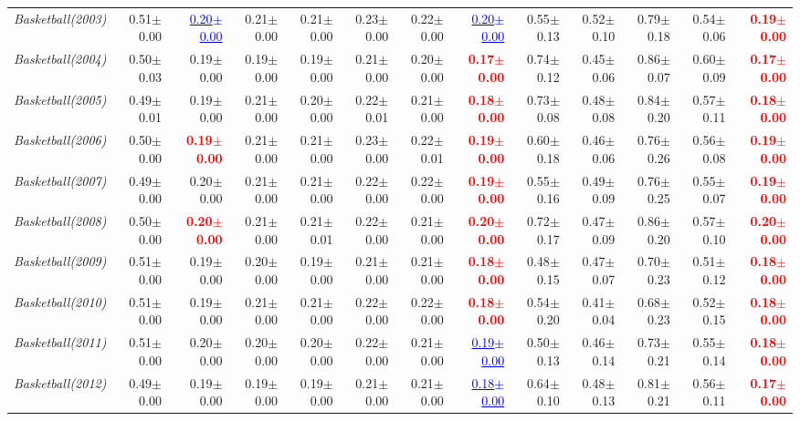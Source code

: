 \documentclass[nohyperref]{article}
\theoremstyle{plain}
\theoremstyle{definition}
\theoremstyle{remark}
\newcommand{\red}[1]{\textcolor{red}{\textbf{#1}}}
\newcommand{\blue}[1]{\textcolor{blue}{\underline{#1}}}
\begin{document}
\begin{table*}[!ht]
{\begin{tabular}{lrr|rrrrr|rrrrr}
			{\it Basketball(2003)} & 0.51$\pm$0.00 & \blue{0.20$\pm$0.00} & 0.21$\pm$0.00 & 0.21$\pm$0.00 & 0.23$\pm$0.00 & 0.22$\pm$0.00 & \blue{0.20$\pm$0.00} & 0.55$\pm$0.13 & 0.52$\pm$0.10 & 0.79$\pm$0.18 & 0.54$\pm$0.06 & \red{0.19$\pm$0.00} \\
			{\it Basketball(2004)} & 0.50$\pm$0.03 & 0.19$\pm$0.00 & 0.19$\pm$0.00 & 0.19$\pm$0.00 & 0.21$\pm$0.00 & 0.20$\pm$0.00 & \red{0.17$\pm$0.00} & 0.74$\pm$0.12 & 0.45$\pm$0.06 & 0.86$\pm$0.07 & 0.60$\pm$0.09 & \red{0.17$\pm$0.00} \\
			{\it Basketball(2005)} & 0.49$\pm$0.01 & 0.19$\pm$0.00 & 0.21$\pm$0.00 & 0.20$\pm$0.00 & 0.22$\pm$0.01 & 0.21$\pm$0.00 & \red{0.18$\pm$0.00} & 0.73$\pm$0.08 & 0.48$\pm$0.08 & 0.84$\pm$0.20 & 0.57$\pm$0.11 & \red{0.18$\pm$0.00} \\
			{\it Basketball(2006)} & 0.50$\pm$0.00 & \red{0.19$\pm$0.00} & 0.21$\pm$0.00 & 0.21$\pm$0.00 & 0.23$\pm$0.00 & 0.22$\pm$0.01 & \red{0.19$\pm$0.00} & 0.60$\pm$0.18 & 0.46$\pm$0.06 & 0.76$\pm$0.26 & 0.56$\pm$0.08 & \red{0.19$\pm$0.00} \\
			{\it Basketball(2007)} & 0.49$\pm$0.00 & 0.20$\pm$0.00 & 0.21$\pm$0.00 & 0.21$\pm$0.00 & 0.22$\pm$0.00 & 0.22$\pm$0.00 & \red{0.19$\pm$0.00} & 0.55$\pm$0.16 & 0.49$\pm$0.09 & 0.76$\pm$0.25 & 0.55$\pm$0.07 & \red{0.19$\pm$0.00} \\
			{\it Basketball(2008)} & 0.50$\pm$0.00 & \red{0.20$\pm$0.00} & 0.21$\pm$0.00 & 0.21$\pm$0.01 & 0.22$\pm$0.00 & 0.21$\pm$0.00 & \red{0.20$\pm$0.00} & 0.72$\pm$0.17 & 0.47$\pm$0.09 & 0.86$\pm$0.20 & 0.57$\pm$0.10 & \red{0.20$\pm$0.00} \\
			{\it Basketball(2009)} & 0.51$\pm$0.00 & 0.19$\pm$0.00 & 0.20$\pm$0.00 & 0.19$\pm$0.00 & 0.21$\pm$0.00 & 0.21$\pm$0.00 & \red{0.18$\pm$0.00} & 0.48$\pm$0.15 & 0.47$\pm$0.07 & 0.70$\pm$0.23 & 0.51$\pm$0.12 & \red{0.18$\pm$0.00} \\
			{\it Basketball(2010)} & 0.51$\pm$0.00 & 0.19$\pm$0.00 & 0.21$\pm$0.00 & 0.21$\pm$0.00 & 0.22$\pm$0.00 & 0.22$\pm$0.00 & \red{0.18$\pm$0.00} & 0.54$\pm$0.20 & 0.41$\pm$0.04 & 0.68$\pm$0.23 & 0.52$\pm$0.15 & \red{0.18$\pm$0.00} \\
			{\it Basketball(2011)} & 0.51$\pm$0.00 & 0.20$\pm$0.00 & 0.20$\pm$0.00 & 0.20$\pm$0.00 & 0.22$\pm$0.00 & 0.21$\pm$0.00 & \blue{0.19$\pm$0.00} & 0.50$\pm$0.13 & 0.46$\pm$0.14 & 0.73$\pm$0.21 & 0.55$\pm$0.14 & \red{0.18$\pm$0.00} \\
			{\it Basketball(2012)} & 0.49$\pm$0.00 & 0.19$\pm$0.00 & 0.19$\pm$0.00 & 0.19$\pm$0.00 & 0.21$\pm$0.00 & 0.21$\pm$0.00 & \blue{0.18$\pm$0.00} & 0.64$\pm$0.10 & 0.48$\pm$0.13 & 0.81$\pm$0.21 & 0.56$\pm$0.11 & \red{0.17$\pm$0.00} \\

\end{tabular}}
\end{table*}
\end{document}
